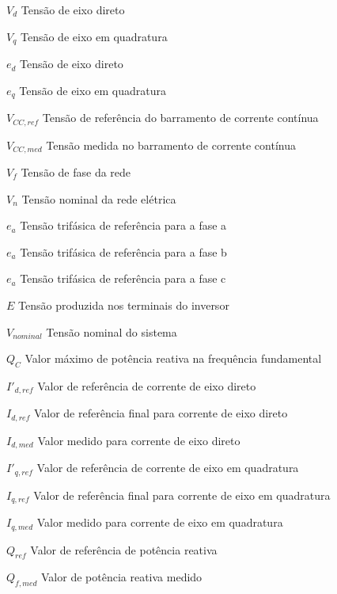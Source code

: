 \begin{simbolos}
  \item[$ V_d $] Tensão de eixo direto
  \item[$ V_q $] Tensão de eixo em quadratura
  \item[$ e_d $] Tensão de eixo direto
  \item[$ e_q $] Tensão de eixo em quadratura
  \item[$ V_{CC,ref} $] Tensão de referência do barramento de corrente contínua
  \item[$ V_{CC,med} $] Tensão medida no barramento de corrente contínua
  \item[$ V_f $] Tensão de fase da rede
  \item[$ V_n $] Tensão nominal da rede elétrica
  \item[$ e_a $] Tensão trifásica de referência para a fase a
  \item[$ e_a $] Tensão trifásica de referência para a fase b
  \item[$ e_a $] Tensão trifásica de referência para a fase c 
  \item[$ E $] Tensão produzida nos terminais do inversor
  \item[$ V_{nominal} $] Tensão nominal do sistema
  \item[$ Q_C $] Valor máximo de potência reativa na frequência fundamental
  \item[$ I'_{d,ref} $] Valor de referência de corrente de eixo direto
  \item[$ I_{d,ref} $] Valor de referência final para corrente de eixo direto
  \item[$ I_{d,med} $] Valor medido para corrente de eixo direto
  \item[$ I'_{q,ref} $] Valor de referência de corrente de eixo em quadratura
  \item[$ I_{q,ref} $] Valor de referência final para corrente de eixo em quadratura
  \item[$ I_{q,med} $] Valor medido para corrente de eixo em quadratura
  \item[$ Q_{ref} $] Valor de referência de potência reativa
  \item[$ Q_{f,med} $] Valor de potência reativa medido
\end{simbolos}
